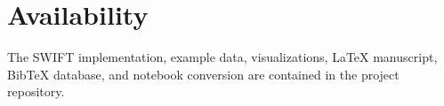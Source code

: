 \documentclass[11pt]{article}
\begin{document}
\section*{Availability}
The SWIFT implementation, example data, visualizations, LaTeX manuscript, BibTeX database, and notebook conversion are contained in the project repository.

\nocite{*}


\end{document}
